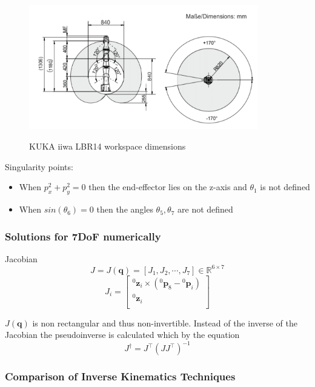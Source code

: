 \begin{center}
\begin{figure}[H]
\centering
\includegraphics[width=10cm]{images/iiwa-workspace.png}\\
\caption{KUKA iiwa LBR14 workspace dimensions}
\end{figure}
\end{center}

Singularity points:
\begin{itemize}
	\item When $p_x^2 + p_y^2 = 0$ then the end-effector lies on the z-axis and $θ_1$ is not defined
	\item When $sin\left( θ_6 \right) = 0$ then the angles $θ_5, θ_7$ are not defined
\end{itemize}

\subsubsection{Solutions for 7DoF numerically}

Jacobian
\[
J = J( \mathbf{q} ) = [ J_1, J_2, \cdots, J_7 ] \in \mathbb{R}^{6 \times 7}
\]
\begin{equation}
J_i = \begin{bmatrix}
{}^0\mathbf{z}_i \times ({}^0\mathbf{p}_8 - {}^0\mathbf{p}_i) \\
{}^0\mathbf{z}_i \\
\end{bmatrix}
\end{equation}

$J( \mathbf{q} )$ is non rectangular and thus non-invertible. Instead of the inverse of the Jacobian the pseudoinverse is calculated which by the 
equation
\begin{equation}
J^{\dagger} = J^\top ( J J^\top )^{-1}
\end{equation}


\subsubsection{Comparison of Inverse Kinematics Techniques}
